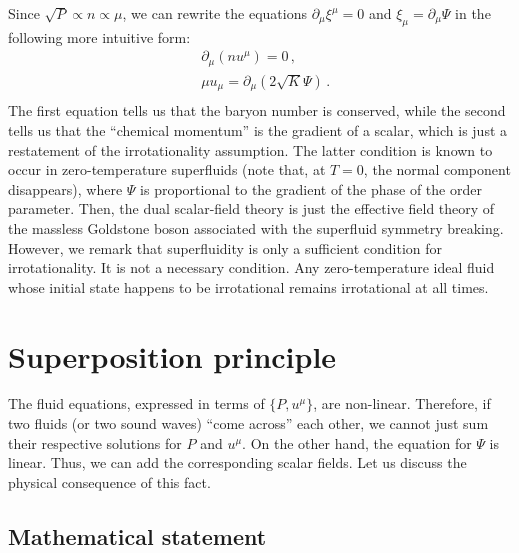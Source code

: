 \documentclass[a4paper, amsfonts, amssymb, amsmath, reprint, showkeys, nofootinbib, twoside,notitlepage,onecolumn]{revtex4-2}
\theoremstyle{definition}
\theoremstyle{theorem}
\theoremstyle{corollary}
\begin{document}
Since $\sqrt{P}\propto n \propto \mu$, we can rewrite the equations $\partial_\mu \xi^\mu=0$ and $\xi_\mu =\partial_\mu \Psi$ in the following more intuitive form:
\begin{equation}
\begin{split}
& \partial_\mu (nu^\mu)=0 \, , \\
& \mu u_\mu =\partial_\mu (2\sqrt{K} \Psi)  \, . \\
\end{split}
\end{equation}
The first equation tells us that the baryon number is conserved, while the second tells us that the ``chemical momentum'' is the gradient of a scalar, which is just a restatement of the irrotationality assumption. The latter condition is known to occur in zero-temperature superfluids \cite{Carter_starting_point,cool1995,Son2001,Termo} (note that, at $T=0$, the normal component disappears), where $\Psi$ is proportional to the gradient of the phase of the order parameter. Then, the dual scalar-field theory is just the effective field theory of the massless Goldstone boson associated with the superfluid symmetry breaking. However, we remark that superfluidity is only a sufficient condition for irrotationality. It is not a necessary condition. Any zero-temperature ideal fluid whose initial state happens to be irrotational remains irrotational at all times. 


\section{Superposition principle}\label{IIIyup}

The fluid equations, expressed in terms of $\{ P,u^\mu\}$, are non-linear. Therefore, if two fluids (or two sound waves) ``come across'' each other, we cannot just sum their respective solutions for $P$ and $u^\mu$. On the other hand, the equation for $\Psi$ is linear. Thus, we can add the corresponding scalar fields. Let us discuss the physical consequence of this fact.


\subsection{Mathematical statement}
\end{document}
